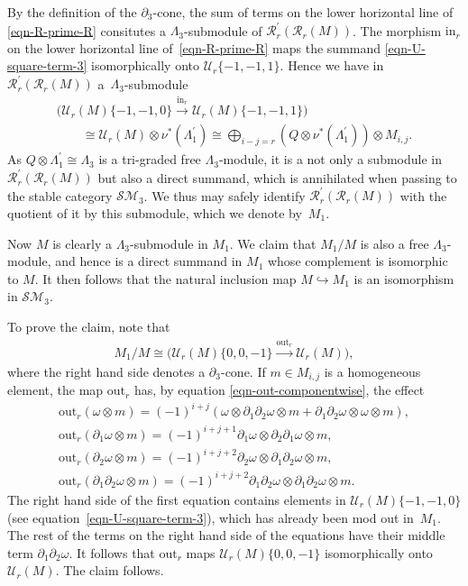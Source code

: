 \documentclass[10pt,a4paper]{amsart}
\theoremstyle{definition}
\numberwithin{equation}{section}
\def\dif{\partial}
\def\mc{\mathcal}
\begin{document}
By the definition of the $\dif_3$-cone, the sum of terms on the lower horizontal line of \eqref{eqn-R-prime-R} consitutes a $\Lambda_3$-submodule of $\mc{R}^\prime_r(\mc{R}_r(M))$. The morphism $\mathrm{in}_r$ on the lower horizontal line of~\eqref{eqn-R-prime-R} maps the summand \eqref{eqn-U-square-term-3} isomorphically onto $\mc{U}_r\{-1,-1,1\}$. Hence we have in~$\mc{R}^\prime_r(\mc{R}_r(M))$ a~$\Lambda_3$-submodule
\begin{gather}
\big(\mc{U}_r(M)\{-1,-1,0\}\xrightarrow{\mathrm{in}_r} \mc{U}_r(M)\{-1,-1,1\}\big)\nonumber\\
\qquad{} \cong \mc{U}_r(M)\otimes \nu^*(\Lambda_1^\prime) \cong \bigoplus_{i-j=r} (Q\otimes \nu^*(\Lambda_1^\prime)) \otimes M_{i,j}.\label{eqn-d3-cone-of-iso-proj}
\end{gather}
As $Q\otimes \Lambda_1^\prime \cong \Lambda_3$ is a tri-graded free $\Lambda_3$-module, it is a not only a submodule in $\mc{R}^\prime_r(\mc{R}_r(M))$ but also a direct summand, which is annihilated when passing to the stable category $\mc{SM}_3$. We thus may safely identify $ \mc{R}^\prime_r(\mc{R}_r(M))$ with the quotient of it by this submodule, which we denote by~$M_1$.

Now $M$ is clearly a $\Lambda_3$-submodule in $M_1$. We claim that $M_1/M$ is also a free $\Lambda_3$-module, and hence is a direct summand in $M_1$ whose complement is isomorphic to $M$.
It then follows that the natural inclusion map $M\hookrightarrow M_1$ is an isomorphism in $\mc{SM}_3$.

To prove the claim, note that
\begin{gather*}
 M_1/M\cong \big( \mc{U}_r(M)\{0,0,-1\}\xrightarrow{\mathrm{out}_r}\mc{U}_r(M) \big),
\end{gather*}
where the right hand side denotes a $\dif_3$-cone. If $m\in M_{i,j}$ is a homogeneous element, the map $\mathrm{out}_r$ has, by equation \eqref{eqn-out-componentwise}, the effect
\begin{gather*}
\mathrm{out}_r(\omega\otimes m) =(-1)^{i+j}\left(\omega\otimes \dif_1\dif_2\omega \otimes m + \dif_1\dif_2\omega\otimes \omega\otimes m\right), \\
\mathrm{out}_r(\dif_1 \omega\otimes m) = (-1)^{i+j+1} \dif_1\omega \otimes \dif_2\dif_1\omega \otimes m,\\
\mathrm{out}_r(\dif_2\omega\otimes m) = (-1)^{i+j+2} \dif_2\omega \otimes \dif_1\dif_2\omega \otimes m,\\
\mathrm{out}_r(\dif_1\dif_2\omega\otimes m) = (-1)^{i+j+2}\dif_1\dif_2\omega\otimes \dif_1\dif_2\omega \otimes m.
\end{gather*}
The right hand side of the first equation contains elements in $\mc{U}_r(M)\{-1,-1,0\}$ (see equation~\eqref{eqn-U-square-term-3}), which has already been mod out in~$M_1$. The rest of the terms on the right hand side of the equations have their middle term $\dif_1\dif_2\omega$. It follows that $\mathrm{out}_r$ maps $\mc{U}_r(M)\{0,0,-1\}$ isomorphically onto~$\mc{U}_r(M)$. The claim follows.
\end{document}

